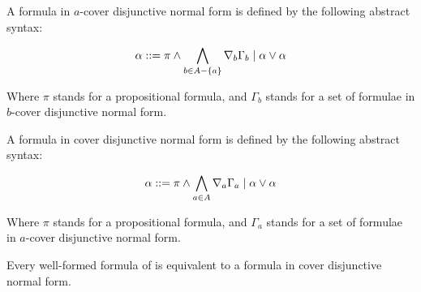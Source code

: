 \begin{definition}
A formula in $a$-cover disjunctive normal form is defined by the following
abstract syntax:

$$
\alpha ::= \pi \land \bigwedge_{b \in A - \{a\}} \nabla_b \Gamma_b \mid
\alpha \lor \alpha
$$

Where $\pi$ stands for a propositional formula, and $\Gamma_b$ stands for a set
of formulae in $b$-cover disjunctive normal form.

A formula in cover disjunctive normal form is defined by the following abstract
syntax:

$$
\alpha ::= \pi \land \bigwedge_{a \in A} \nabla_a \Gamma_a \mid
\alpha \lor \alpha
$$

Where $\pi$ stands for a propositional formula, and $\Gamma_a$ stands for a set
of formulae in $a$-cover disjunctive normal form.
\end{definition}

\begin{lemma}
Every well-formed formula of \logicKD{} is equivalent to a formula in
cover disjunctive normal form.
\end{lemma}

